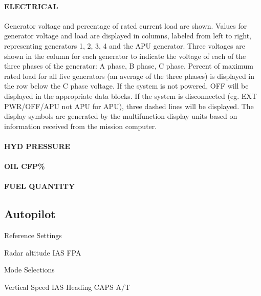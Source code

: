 \paragraph*{ELECTRICAL}
Generator voltage and percentage of rated current load are shown. Values for generator voltage and load are displayed in columns, labeled from left to right, representing generators 1, 2, 3, 4 and the APU generator. Three voltages are shown in the column for each generator to indicate the voltage of each of the three phases of the generator: A phase, B phase, C phase. Percent of maximum rated load for all five generators (an average of the three phases) is displayed in the row below the C phase voltage. If the system is not powered, OFF will be displayed in the appropriate data blocks. If the system is disconnected (eg. EXT PWR/OFF/APU not APU for APU), three dashed lines will be displayed. The display symbols are generated by the multifunction display units based on information received from the mission computer. 

\paragraph*{HYD PRESSURE}

\paragraph*{OIL CFP\%}

\paragraph*{FUEL QUANTITY}

\subsection{Autopilot}

Reference Settings
\begin{enumerate}
   Radar altitude
   \gls{IAS}
   \gls{FPA}
\end{enumerate}

Mode Selections
\begin{enumerate}
   Vertical Speed
   \gls{IAS}
   Heading
   \gls{CAPS}
   \gls{A/T}
\end{enumerate}

